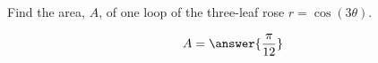 \documentclass{ximera}
\author{David Guichard \and Neal Koblitz \and H. Jerome Keisler \and Albert Scheller \and Barry Balof \and Mike Wills \and Matthew Carr}
\begin{document}
\begin{exercise}





Find the area, $A$, of one loop of the three-leaf rose $r=\cos(3\theta)$.
\begin{prompt}
\[
A=\answer{\frac{\pi}{12}}
\]
\end{prompt}



\end{exercise}
\end{document}
